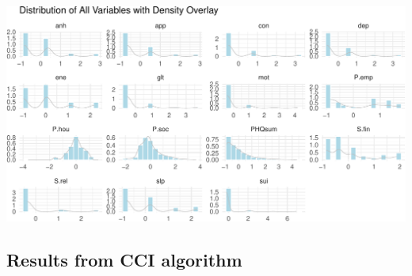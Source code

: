 \documentclass[
]{article}
\begin{document}
\begin{center}
\includegraphics{draft_v2_files/figure-pdf/unnamed-chunk-22-1.pdf}
\end{center}

\subsection{Results from CCI algorithm}\label{sec-cci}
\end{document}
